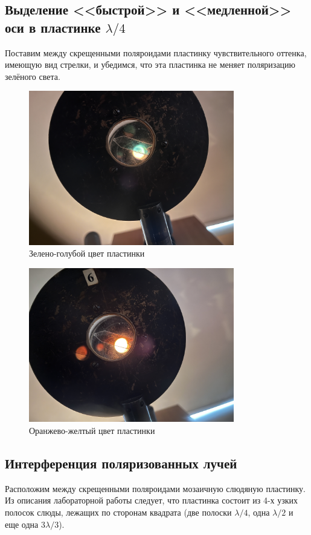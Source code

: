 \subsection*{Выделение <<быстрой>> и <<медленной>> оси в пластинке $\lambda/4$}
Поставим между скрещенными поляроидами пластинку чувствительного оттенка, имеющую вид стрелки, и убедимся, что эта пластинка не меняет поляризацию зелёного света.

\begin{figure}[H]
  \centering
  \includegraphics[width=0.8\textwidth]{IMG_3196.JPG}
  \caption{Зелено-голубой цвет пластинки}
\end{figure}

\begin{figure}[H]
  \centering
  \includegraphics[width=0.8\textwidth]{IMG_3197.JPG}
  \caption{Оранжево-желтый цвет пластинки}
\end{figure}

\subsection*{Интерференция поляризованных лучей}
Расположим между скрещенными поляроидами мозаичную слюдяную пластинку. Из описания лабораторной работы следует, что пластинка состоит из 4-х узких полосок слюды, лежащих по сторонам квадрата (две полоски $\lambda/4$, одна $\lambda/2$ и еще одна $3\lambda/3$).

